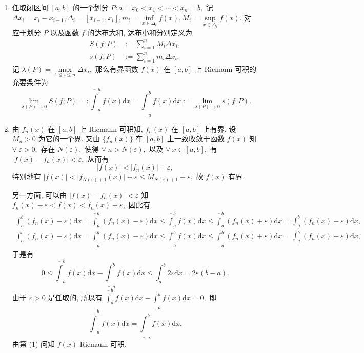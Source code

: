 \begin{solution}
\begin{enumerate}
\item 任取闭区间 $[a, b]$ 的一个划分 $P: a = x_0 < x_1 < \cdots < x_n = b,$ 记 $\Delta x_i = x_i - x_{i-1}, \Delta_i = [x_{i-1}, x_i], m_i = \inf\limits_{x\in \Delta_i} f(x), M_i = \sup\limits_{x\in \Delta_i} f(x).$ 对应于划分 $P$ 以及函数 $f$ 的达布大和, 达布小和分别定义为
\begin{align*}
S(f; P) & := \sum\limits_{i = 1}^n M_i \Delta x_i, \\
s(f; P) & := \sum\limits_{i = 1}^n m_i \Delta x_i.
\end{align*}
记 $\lambda(P) = \max\limits_{1\leqslant i \leqslant n} \Delta x_i,$ 那么有界函数 $f(x)$ 在 $[a, b]$ 上 Riemann 可积的充要条件为
\[\lim\limits_{\lambda(P) \to 0} S(f; P) =: \overline{\int}_a^b f(x) \mathrm{d} x = \underline{\int}_a^b f(x) \mathrm{d} x := \lim\limits_{\lambda(P) \to 0} s(f; P).\]
\item 由 $f_n(x)$ 在 $[a, b]$ 上 Riemann 可积知, $f_n(x)$ 在 $[a, b]$ 上有界. 设 $M_n > 0$ 为它的一个界. 又由 $\{f_n(x)\}$ 在 $[a, b]$ 上一致收敛于函数 $f(x)$ 知 $\forall ~ \varepsilon > 0,$ 存在 $N(\varepsilon),$ 使得 $\forall ~ n > N(\varepsilon),$ 以及 $\forall ~ x \in [a, b],$ 有 $\lvert f(x) - f_n(x) \rvert < \varepsilon,$ 从而有
\[\lvert f(x) \rvert < \lvert f_n(x) \rvert + \varepsilon,\]
特别地有 $\lvert f(x) \rvert < \lvert f_{N(\varepsilon) + 1}(x) \rvert + \varepsilon \leqslant M_{N(\varepsilon) + 1} + \varepsilon,$ 故 $f(x)$ 有界.

另一方面, 可以由 $\lvert f(x) - f_n(x) \rvert < \varepsilon$ 知 $f_n(x) - \varepsilon < f(x) < f_n(x) +\varepsilon,$ 因此有
\begin{gather*}
\int_a^b (f_n(x) - \varepsilon) \mathrm{d} x = \overline{\int}_a^b (f_n(x) - \varepsilon) \mathrm{d} x \leqslant \overline{\int}_a^b f(x) \mathrm{d} x \leqslant \overline{\int}_a^b (f_n(x) + \varepsilon) \mathrm{d} x = \int_a^b (f_n(x) + \varepsilon) \mathrm{d} x, \\
\int_a^b (f_n(x) - \varepsilon) \mathrm{d} x = \underline{\int}_a^b (f_n(x) - \varepsilon) \mathrm{d} x \leqslant \underline{\int}_a^b f(x) \mathrm{d} x \leqslant \underline{\int}_a^b (f_n(x) + \varepsilon) \mathrm{d} x = \int_a^b (f_n(x) + \varepsilon) \mathrm{d} x,
\end{gather*}
于是有
\[0 \leqslant \overline{\int}_a^b f(x) \mathrm{d} x - \underline{\int}_a^b f(x) \mathrm{d} x \leqslant \int_a^b 2\varepsilon \mathrm{d} x = 2\varepsilon (b-a).\]
由于 $\varepsilon > 0$ 是任取的, 所以有 $\overline{\int}_a^b f(x) \mathrm{d} x - \underline{\int}_a^b f(x) \mathrm{d} x = 0,$ 即
\[\overline{\int}_a^b f(x) \mathrm{d} x = \underline{\int}_a^b f(x) \mathrm{d} x.\]
由第 (1) 问知 $f(x)$ Riemann 可积.


\end{enumerate}
\end{solution}
